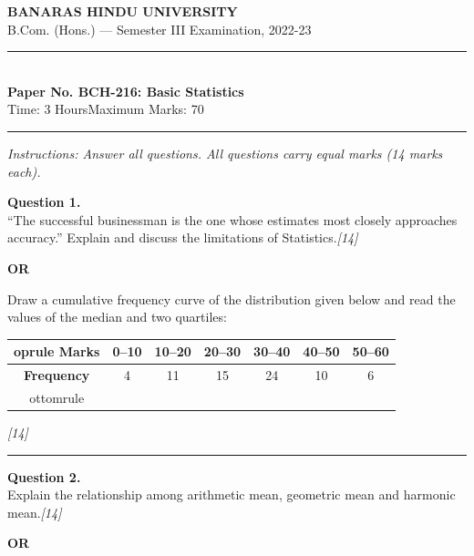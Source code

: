 \documentclass[11pt,a4paper]{article}
\newcommand{\pts}[1]{\hfill   \textit{[#1]}}
\begin{document}
\begin{center}
  {\large\bfseries BANARAS HINDU UNIVERSITY}\\[2pt]
  {\normalsize B.Com. (Hons.) --- Semester III Examination, 2022-23}\\[6pt]
  \rule{0.8\linewidth}{0.5pt}\\[6pt]
  {\large\bfseries Paper No. BCH-216: Basic Statistics}\\[4pt]
  {\normalsize Time: 3 Hours\hfill Maximum Marks: 70}
\end{center}

\rule{\linewidth}{0.4pt}

\smallskip



\noindent   \textit{Instructions: Answer all questions. All questions carry equal marks (14 marks each).}

\bigskip




\noindent   \textbf{Question 1.} \\
``The successful businessman is the one whose estimates most closely approaches accuracy.'' Explain and discuss the limitations of Statistics.\pts{14}

\centerline{   \textbf{OR}}

Draw a cumulative frequency curve of the distribution given below and read the values of the median and two quartiles:

\begin{center}
  
\begin{tabular}{ccccccc}
     oprule
   \textbf{Marks} & 0--10 & 10--20 & 20--30 & 30--40 & 40--50 & 50--60 \\
    \midrule
   \textbf{Frequency} & 4 & 11 & 15 & 24 & 10 & 6 \\
    ottomrule
  \end{tabular}
\end{center}\pts{14}

\medskip\rule{\linewidth}{0.2pt}




\noindent   \textbf{Question 2.} \\
Explain the relationship among arithmetic mean, geometric mean and harmonic mean.\pts{14}

\centerline{   \textbf{OR}}
\end{document}
